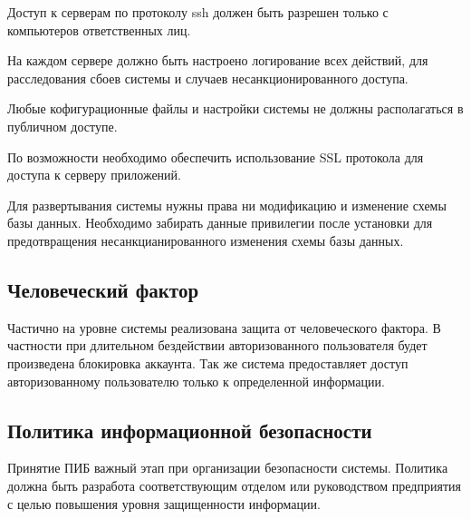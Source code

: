 Доступ к серверам по протоколу ssh должен быть разрешен только с компьютеров
ответственных лиц.

На каждом сервере должно быть настроено логирование всех действий, для
расследования сбоев системы и случаев несанкционированного доступа.

Любые кофигурационные файлы и настройки системы не должны располагаться в
публичном доступе.

По возможности необходимо обеспечить использование SSL протокола для доступа к
серверу приложений.

Для развертывания системы нужны права ни модификацию и изменение схемы базы
данных. Необходимо забирать данные привилегии после установки для предотвращения
несанкцианированного изменения схемы базы данных.

\subsection{Человеческий фактор}
Частично на уровне системы реализована защита от человеческого фактора. В
частности при длительном бездействии авторизованного пользователя будет
произведена блокировка аккаунта. Так же система предоставляет доступ
авторизованному пользователю только к определенной информации.

\subsection{Политика информационной безопасности}
Принятие ПИБ важный этап при организации безопасности системы. Политика должна
быть разработа соответствующим отделом или руководством предприятия с целью
повышения уровня защищенности информации.
